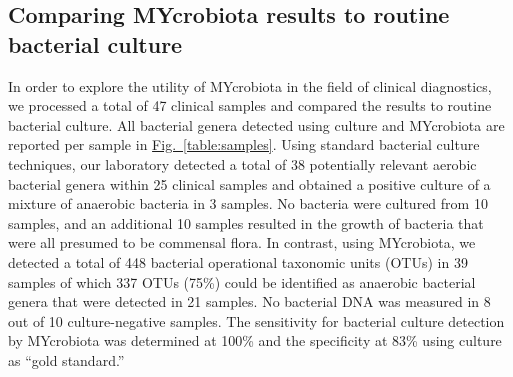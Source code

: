 \subsection*{Comparing MYcrobiota results to routine bacterial culture}
In order to explore the utility of MYcrobiota in the field of clinical diagnostics, we processed a total of 47 clinical samples and compared the results to routine bacterial culture. All bacterial genera detected using culture and MYcrobiota are reported per sample in \hyperref[table:samples]{Fig.~\ref{table:samples}}. Using standard bacterial culture techniques, our laboratory detected a total of 38 potentially relevant aerobic bacterial genera within 25 clinical samples and obtained a positive culture of a mixture of anaerobic bacteria in 3 samples. No bacteria were cultured from 10 samples, and an additional 10 samples resulted in the growth of bacteria that were all presumed to be commensal flora. In contrast, using MYcrobiota, we detected a total of 448 bacterial operational taxonomic units (OTUs) in 39 samples of which 337 OTUs (75\%) could be identified as anaerobic bacterial genera that were detected in 21 samples. No bacterial DNA was measured in 8 out of 10 culture-negative samples. The sensitivity for bacterial culture detection by MYcrobiota was determined at 100\% and the specificity at 83\% using culture as “gold standard.”


